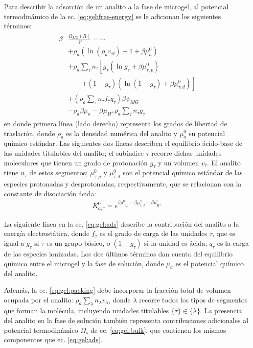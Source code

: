 Para describir la adsorci\'on de un analito a la fase de microgel,
al potencial termodin\'amico de la ec. \ref{eq:gel:free-energy} se le adicionan los siguientes t\'erminos:
%
%
%
\begin{align}
\begin{aligned}
\beta&\frac{\Omega_{MG}(R)}{V}= \cdots\\&+ \rho_a\left(\ln\left(\rho_a v_w\right) -1 + \beta\mu^0_a\right) \\
& + \rho_a \sum_\tau n_\tau  \left[g_\tau(\ln g_\tau+ \beta\mu^0_{\tau,p})\right.\\
&\qquad\left.+(1-g_\tau)(\ln (1-g_\tau)+\beta\mu^0_{\tau, d})\right] \\
& +  \left( \rho_a \sum_\tau n_\tau f_\tau q_\tau\right)\beta\psi_{MG}\\
& -\rho_a\beta\mu_a
 -\beta\mu_{H^+} \rho_a \sum_\tau n_\tau g_\tau
\end{aligned}
\label{eq:gel:ads}
\end{align}
%
\noindent en donde primera l\'inea (lado derecho) representa los grados de libertad de traslaci\'on,
donde $\rho_a$ es la densidad num\'erica del analito y $\mu_a^0$ su potencial qu\'imico est\'andar.
Las siguientes dos l\'ineas describen el equilibrio \'acido-base de las unidades titulables del analito;
el sub\'indice $\tau$ recorre dichas unidades moleculares que tienen un grado de protonaci\'on $g_\tau$ y un volumen $v_\tau$.
El analito tiene $n_\tau$ de estos segmentos;
$\mu^0_{\tau, p}$ y $\mu^0_{\tau,d}$ son el potencial qu\'imico est\'andar de las especies protonadas y desprotonadas, respectivamente, que se relacionan con la constante de disociaci\'on \'acida:
%
\begin{align}
K^0_{a,\tau}= e^{\beta\mu^0_{\tau, p}-\beta\mu^0_{\tau,d}-\beta\mu^0_{H^+}}
\end{align}
%

La siguiente l\'inea en la ec. \ref{eq:gel:ads} describe la contribuci\'on del analito a la energ\'ia electrost\'atica, donde $f_\tau$ es el grado de carga de las unidades $\tau$, que es igual a $g_\tau$ si $\tau$ es un grupo b\'asico, o $(1-g_\tau)$ si la unidad es \'acida; $q_\tau$ es la carga de las especies ionizadas.
Los dos \'ultimos t\'erminos dan cuenta del equilibrio qu\'imico entre el microgel y la fase de soluci\'on, donde $\mu_a$ es el potencial qu\'imico del analito.

Adem\'as, la ec. \ref{eq:gel:packing} debe incorporar la fracci\'on total de volumen ocupada por el analito: $\rho_a \sum_\lambda n_\lambda v_\lambda$, donde $\lambda$ recorre todos los tipos de segmentos que forman la mol\'ecula, incluyendo unidades titulables $\{\tau\}\in\{\lambda\}$.
La presencia del analito en la fase de soluci\'on tambi\'en representa contribuciones adicionales al potencial termodin\'amico $\Omega_s$ de ec. \ref{eq:gel:bulk}, que contienen los mismos componentes que ec. \ref{eq:gel:ads}.

